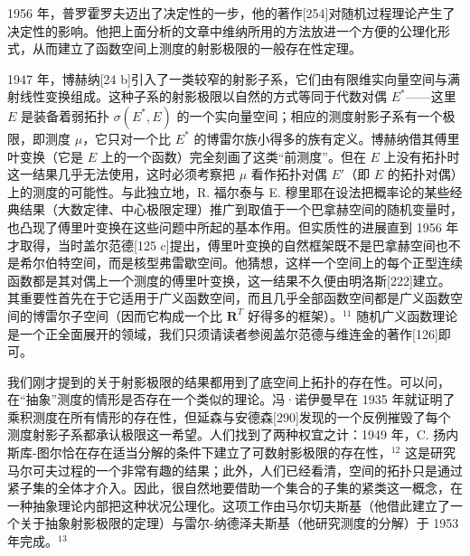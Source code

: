 1956 年，普罗霍罗夫迈出了决定性的一步，他的著作{[}254{]}对随机过程理论产生了决定性的影响。他把上面分析的文章中维纳所用的方法放进一个方便的公理化形式，从而建立了函数空间上测度的射影极限的一般存在性定理。

1947 年，博赫纳{[}24 b{]}引入了一类较窄的射影子系，它们由有限维实向量空间与满射线性变换组成。这种子系的射影极限以自然的方式等同于代数对偶 \(E^*\)——这里 \(E\) 是装备着弱拓扑 \(\sigma(E^*, E)\) 的一个实向量空间；相应的测度射影子系有一个极限，即测度 \(\mu\)，它只对一个比 \(E^*\) 的博雷尔族小得多的族有定义。博赫纳借其傅里叶变换（它是 \(E\) 上的一个函数）完全刻画了这类“前测度”。但在 \(E\) 上没有拓扑时这一结果几乎无法使用，这时必须考察把 \(\mu\) 看作拓扑对偶 \(E'\)（即 \(E\) 的拓扑对偶）上的测度的可能性。与此独立地，R. 福尔泰与 E. 穆里耶在设法把概率论的某些经典结果（大数定律、中心极限定理）推广到取值于一个巴拿赫空间的随机变量时，也凸现了傅里叶变换在这些问题中所起的基本作用。但实质性的进展直到 1956 年才取得，当时盖尔范德{[}125 c{]}提出，傅里叶变换的自然框架既不是巴拿赫空间也不是希尔伯特空间，而是核型弗雷歇空间。他猜想，这样一个空间上的每个正型连续函数都是其对偶上一个测度的傅里叶变换，这一结果不久便由明洛斯{[}222{]}建立。其重要性首先在于它适用于广义函数空间，而且几乎全部函数空间都是广义函数空间的博雷尔子空间（因而它构成一个比 \(\mathbf{R}^T\) 好得多的框架）。\(^{11}\) 随机广义函数理论是一个正全面展开的领域，我们只须请读者参阅盖尔范德与维连金的著作{[}126{]}即可。

我们刚才提到的关于射影极限的结果都用到了底空间上拓扑的存在性。可以问，在“抽象”测度的情形是否存在一个类似的理论。冯·诺伊曼早在 1935 年就证明了乘积测度在所有情形的存在性，但延森与安德森{[}290{]}发现的一个反例摧毁了每个测度射影子系都承认极限这一希望。人们找到了两种权宜之计：1949 年，C. 扬内斯库-图尔恰在存在适当分解的条件下建立了可数射影极限的存在性，\(^{12}\) 这是研究马尔可夫过程的一个非常有趣的结果；此外，人们已经看清，空间的拓扑只是通过紧子集的全体才介入。因此，很自然地要借助一个集合的子集的紧类这一概念，在一种抽象理论内部把这种状况公理化。这项工作由马尔切夫斯基（他借此建立了一个关于抽象射影极限的定理）与雷尔-纳德泽夫斯基（他研究测度的分解）于 1953 年完成。\(^{13}\)

